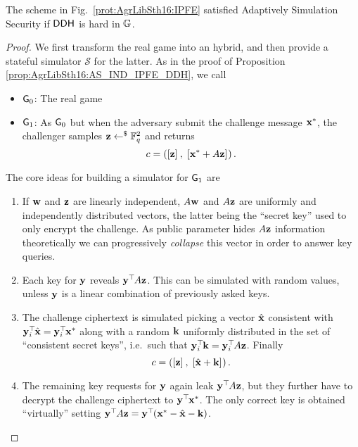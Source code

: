 \begin{proposition}
	The scheme in Fig.~\ref{prot:AgrLibSth16:IPFE} satisfied Adaptively Simulation Security if $\mathsf{DDH}^{}$ is hard in $\mathbb{G}$.
\end{proposition}
\begin{proof}
	We first transform the real game into an hybrid, and then provide a stateful simulator $\mathcal{S}$ for the latter.
	As in the proof of Proposition \ref{prop:AgrLibSth16:AS_IND_IPFE_DDH}, we call
	\begin{itemize}
		\item $\mathsf{G}_0$: The real game 
		
		\item $\mathsf{G}_1$: As $\mathsf{G}_0$ but when the adversary submit the challenge message $\mathbf{x}^\ast$, the challenger samples $\mathbf{z} \gets^{\$} \mathbb{F}_q^2$ and returns
		\[
			c = \left( \left[{\mathbf{z}}\right]_{}, \; \left[{\mathbf{x}^\ast + A \mathbf{z}}\right]_{} \right).
		\]
	\end{itemize}
	The core ideas for building a simulator for $\mathsf{G}_1$ are
	\begin{enumerate}
		\item If $\mathbf{w}$ and $\mathbf{z}$ are linearly independent, $A \mathbf{w}$ and $A \mathbf{z}$ are uniformly and independently distributed vectors, the latter being the ``secret key'' used to only encrypt the challenge.
		As public parameter hides $A\mathbf{z}$ information theoretically we can progressively \textit{collapse} this vector in order to answer key queries.
		
		\item Each key for $\mathbf{y}$ reveals $\mathbf{y}^\top\hspace{-.1em} A \mathbf{z}$.
		This can be simulated with random values, unless $\mathbf{y}$ is a linear combination of previously asked keys.
		
		\item The challenge ciphertext is simulated picking a vector $\hat{\mathbf{x}}$ consistent with $\mathbf{y}_i^\top\hspace{-.1em} \hat{\mathbf{x}} = \mathbf{y}_i^\top\hspace{-.1em} \mathbf{x}^\ast$ along with a random $\mathbf{k}$ uniformly distributed in the set of ``consistent secret keys'', i.e.\ such that $\mathbf{y}_i^\top\hspace{-.1em} \mathbf{k} = \mathbf{y}_i^\top\hspace{-.1em} A \mathbf{z}$.
		Finally
		\[
			c = \left( \left[{\mathbf{z}}\right]_{}, \; \left[{\hat{\mathbf{x}} + \mathbf{k}}\right]_{} \right).
		\]
		
		\item The remaining key requests for $\mathbf{y}$ again leak $\mathbf{y}^\top\hspace{-.1em} A \mathbf{z}$, but they further have to decrypt the challenge ciphertext to $\mathbf{y}^\top\hspace{-.1em} \mathbf{x}^\ast$.
		The only correct key is obtained ``virtually'' setting $\mathbf{y}^\top\hspace{-.1em} A \mathbf{z} = \mathbf{y}^\top\hspace{-.1em}(\mathbf{x}^\ast - \hat{\mathbf{x}} - \mathbf{k})$.
	\end{enumerate}
	

\end{proof}
